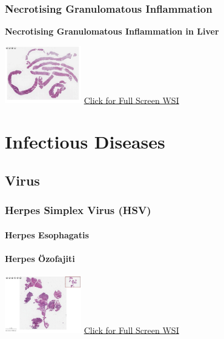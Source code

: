 \documentclass[
  letterpaper,
  paper=6in:9in,
  pagesize=pdftex,
  headinclude=on,
  footinclude=on,
  12pt]{scrbook}
\begin{document}
\hypertarget{sec-necrotising-granulamatoz-inflamation}{%
\section{Necrotising Granulomatous
Inflammation}\label{sec-necrotising-granulamatoz-inflamation}}

\textbf{Necrotising Granulomatous Inflammation in Liver}

\href{https://images.patolojiatlasi.com/necrotisinggranuloma/HE.html}{\includegraphics[width=0.25\textwidth,height=\textheight]{./screenshots/necrotisinggranuloma_screenshot.png}}
\href{https://images.patolojiatlasi.com/necrotisinggranuloma/HE.html}{Click
for Full Screen WSI}

\part{Infectious Diseases}

\hypertarget{sec-virus}{%
\chapter{Virus}\label{sec-virus}}

\hypertarget{sec-herpes-simplex-virus}{%
\section{Herpes Simplex Virus (HSV)}\label{sec-herpes-simplex-virus}}

\hypertarget{sec-herpes-esophagatis}{%
\subsection{Herpes Esophagatis}\label{sec-herpes-esophagatis}}

\hypertarget{sec-herpes-ozofajiti}{%
\subsection{Herpes Özofajiti}\label{sec-herpes-ozofajiti}}

\href{https://images.patolojiatlasi.com/HSV/herpesesophagitis/viewer_z0.html}{\includegraphics[width=0.25\textwidth,height=\textheight]{./screenshots/herpesesophagitis_screenshot.png}}
\href{https://images.patolojiatlasi.com/HSV/herpesesophagitis/viewer_z0.html}{Click
for Full Screen WSI}
\end{document}
